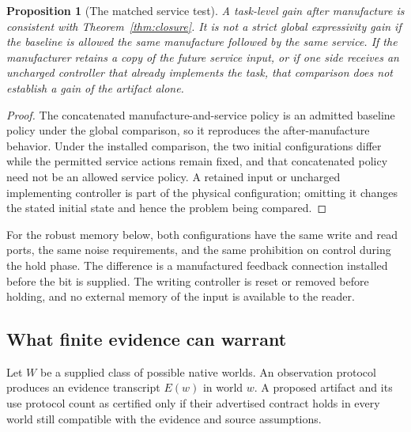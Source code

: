 \documentclass[11pt]{article}
\newtheorem{proposition}[theorem]{Proposition}
\theoremstyle{definition}
\theoremstyle{remark}
\begin{document}
\begin{proposition}[The matched service test]\label{prop:fairness}
A task-level gain after manufacture is consistent with
Theorem~\ref{thm:closure}. It is not a strict global expressivity gain if the
baseline is allowed the same manufacture followed by the same service.
If the manufacturer retains a copy of the future service input, or if
one side receives an uncharged controller that already implements the
task, that comparison does not establish a gain of the artifact alone.
\end{proposition}
\begin{proof}
The concatenated manufacture-and-service policy is an admitted baseline
policy under the global comparison, so it reproduces the after-manufacture
behavior. Under the installed comparison, the two initial configurations
differ while the permitted service actions remain fixed, and that
concatenated policy need not be an allowed service policy. A retained
input or uncharged implementing controller is part of the physical
configuration; omitting it changes the stated initial state and hence
the problem being compared.
\end{proof}

For the robust memory below, both configurations have the same write and
read ports, the same noise requirements, and the same prohibition on
control during the hold phase. The difference is a manufactured feedback
connection installed before the bit is supplied. The writing controller
is reset or removed before holding, and no external memory of the input
is available to the reader.

\subsection{What finite evidence can warrant}\label{sec:evidence}
Let $W$ be a supplied class of possible native worlds. An observation
protocol produces an evidence transcript $E(w)$ in world $w$. A proposed
artifact and its use protocol count as certified only if their advertised
contract holds in every world still compatible with the evidence and
source assumptions.
\end{document}
